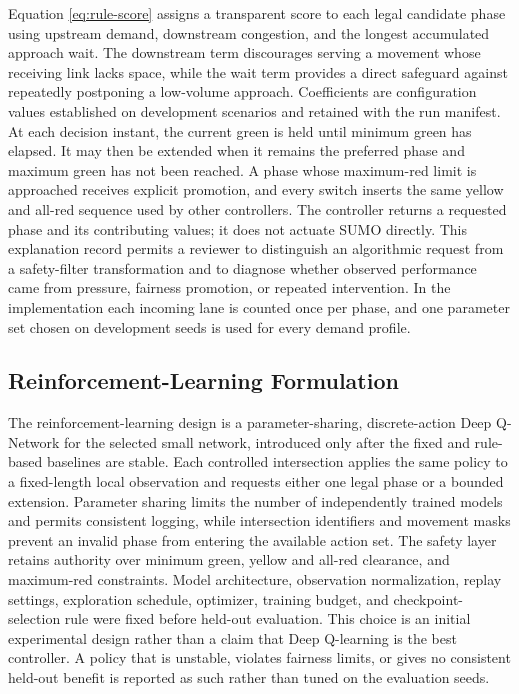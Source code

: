 Equation \ref{eq:rule-score} assigns a transparent score to each legal candidate phase using upstream demand, downstream congestion, and the longest accumulated approach wait. The downstream term discourages serving a movement whose receiving link lacks space, while the wait term provides a direct safeguard against repeatedly postponing a low-volume approach. Coefficients are configuration values established on development scenarios and retained with the run manifest. At each decision instant, the current green is held until minimum green has elapsed. It may then be extended when it remains the preferred phase and maximum green has not been reached. A phase whose maximum-red limit is approached receives explicit promotion, and every switch inserts the same yellow and all-red sequence used by other controllers. The controller returns a requested phase and its contributing values; it does not actuate SUMO directly. This explanation record permits a reviewer to distinguish an algorithmic request from a safety-filter transformation and to diagnose whether observed performance came from pressure, fairness promotion, or repeated intervention. In the implementation each incoming lane is counted once per phase, and one parameter set chosen on development seeds is used for every demand profile.

\subsection{Reinforcement-Learning Formulation}

The reinforcement-learning design is a parameter-sharing, discrete-action Deep Q-Network for the selected small network, introduced only after the fixed and rule-based baselines are stable. Each controlled intersection applies the same policy to a fixed-length local observation and requests either one legal phase or a bounded extension. Parameter sharing limits the number of independently trained models and permits consistent logging, while intersection identifiers and movement masks prevent an invalid phase from entering the available action set. The safety layer retains authority over minimum green, yellow and all-red clearance, and maximum-red constraints. Model architecture, observation normalization, replay settings, exploration schedule, optimizer, training budget, and checkpoint-selection rule were fixed before held-out evaluation. This choice is an initial experimental design rather than a claim that Deep Q-learning is the best controller. A policy that is unstable, violates fairness limits, or gives no consistent held-out benefit is reported as such rather than tuned on the evaluation seeds.

